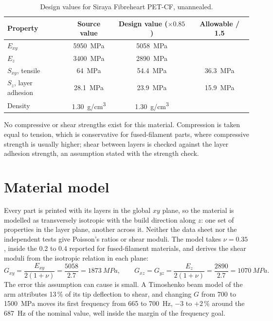 \begin{table}[htbp]
\centering\small
\caption{Design values for Siraya Fibreheart PET-CF, unannealed.}\label{tab:material-design}
\begin{tabular}{@{}lccc@{}}
\toprule
Property & Source value & Design value ($\times 0.85$) & Allowable / 1.5\\
\midrule
$E_{xy}$ & \SI{5950}{MPa} & \SI{5058}{MPa} & \\
$E_z$ & \SI{3400}{MPa} & \SI{2890}{MPa} & \\
$S_{xy}$, tensile & \SI{64}{MPa} & \SI{54.4}{MPa} & \SI{36.3}{MPa}\\
$S_z$, layer adhesion & \SI{28.1}{MPa} & \SI{23.9}{MPa} & \SI{15.9}{MPa}\\
Density & \SI{1.30}{g/cm^3} & \SI{1.30}{g/cm^3} & \\
\bottomrule
\end{tabular}
\end{table}

No compressive or shear strengths exist for this material. Compression is taken equal to tension, which is conservative for fused-filament parts, where compressive strength is usually higher; shear between layers is checked against the layer adhesion strength, an assumption stated with the strength check.

\section{Material model}\label{sec:material-model}

Every part is printed with its layers in the global $xy$ plane, so the material is modelled as transversely isotropic with the build direction along $z$: one set of properties in the layer plane, another across it. Neither the data sheet nor the independent tests give Poisson's ratios or shear moduli. The model takes $\nu = 0.35$, inside the 0.2 to 0.4 reported for fused-filament materials, and derives the shear moduli from the isotropic relation in each plane:
\begin{equation}
G_{xy} = \frac{E_{xy}}{2(1+\nu)} = \frac{5058}{2.7} = \SI{1873}{MPa}, \qquad G_{xz} = G_{yz} = \frac{E_z}{2(1+\nu)} = \frac{2890}{2.7} = \SI{1070}{MPa}.
\end{equation}
The error this assumption can cause is small. A Timoshenko beam model of the arm attributes 13\,\% of its tip deflection to shear, and changing $G$ from 700 to \SI{1500}{MPa} moves its first frequency from 665 to \SI{700}{Hz}, $-3$ to $+2$\,\% around the \SI{687}{Hz} of the nominal value, well inside the margin of the frequency goal.

